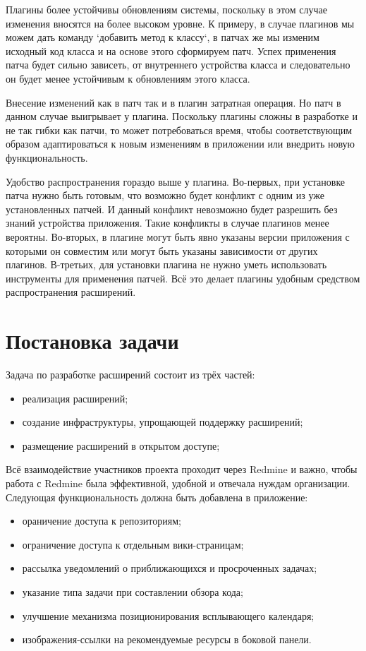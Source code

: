 Плагины более устойчивы обновлениям системы, поскольку в этом случае изменения
вносятся на более высоком уровне. К примеру, в случае плагинов мы можем дать
команду `добавить метод к классу`, в патчах же мы изменим исходный код класса и
на основе этого сформируем патч. Успех применения патча будет сильно зависеть,
от внутреннего устройства класса и следовательно он будет менее устойчивым к
обновлениям этого класса.

Внесение изменений как в патч так и в плагин затратная операция. Но патч в
данном случае выигрывает у плагина. Поскольку плагины сложны в разработке и не
так гибки как патчи, то может потребоваться время, чтобы соответствующим
образом адаптироваться к новым изменениям в приложении или внедрить новую
функциональность.

Удобство распространения гораздо выше у плагина. Во-первых, при установке патча
нужно быть готовым, что возможно будет конфликт с одним из уже установленных
патчей. И данный конфликт невозможно будет разрешить без знаний устройства
приложения.
Такие конфликты в случае плагинов менее вероятны. Во-вторых, в плагине могут
быть явно указаны версии приложения с которыми он совместим или могут быть
указаны зависимости от других плагинов. В-третьих, для установки плагина не
нужно уметь использовать инструменты для применения патчей. Всё это делает
плагины удобным средством распространения расширений.


\section{Постановка задачи}
Задача по разработке расширений состоит из трёх частей:
\begin{itemize}
  \item реализация расширений;
  \item создание инфраструктуры, упрощающей поддержку расширений;
  \item размещение расширений в открытом доступе;
\end{itemize}
   
Всё взаимодействие участников проекта проходит через Redmine и важно, чтобы
работа с Redmine была эффективной, удобной и отвечала нуждам организации.
Следующая функциональность должна быть добавлена в приложение:
\begin{itemize}
  \item ораничение доступа к репозиториям;
  \item ограничение доступа к отдельным вики-страницам;
  \item рассылка уведомлений о приближающихся и просроченных
  задачах; 
  \item указание типа задачи при составлении обзора кода;
  \item улучшение механизма позиционирования всплывающего календаря;
  \item изображения-ссылки на рекомендуемые ресурсы в боковой панели.
\end{itemize}

